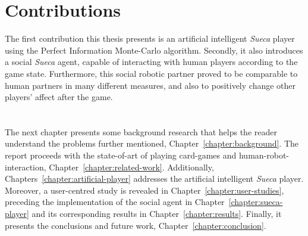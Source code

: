 \section*{Contributions}
The first contribution this thesis presents is an artificial intelligent \emph{Sueca} player using the Perfect Information Monte-Carlo algorithm.
Secondly, it also introduces a social \emph{Sueca} agent, capable of interacting with human players according to the game state.
Furthermore, this social robotic partner proved to be comparable to human partners in many different measures, and also to positively change other players' affect after the game.

\section*{\centering*}

The next chapter presents some background research that helps the reader understand the problems further mentioned, Chapter~\ref{chapter:background}.
The report proceeds with the state-of-art of playing card-games and human-robot-interaction, Chapter~\ref{chapter:related-work}.
Additionally, Chapters~\ref{chapter:artificial-player} addresses the artificial intelligent \emph{Sueca} player.
Moreover, a user-centred study is revealed in Chapter~\ref{chapter:user-studies}, preceding the implementation of the social agent in Chapter~\ref{chapter:sueca-player} and its corresponding results in Chapter~\ref{chapter:results}.
Finally, it presents the conclusions and future work, Chapter~\ref{chapter:conclusion}.

\cleardoublepage